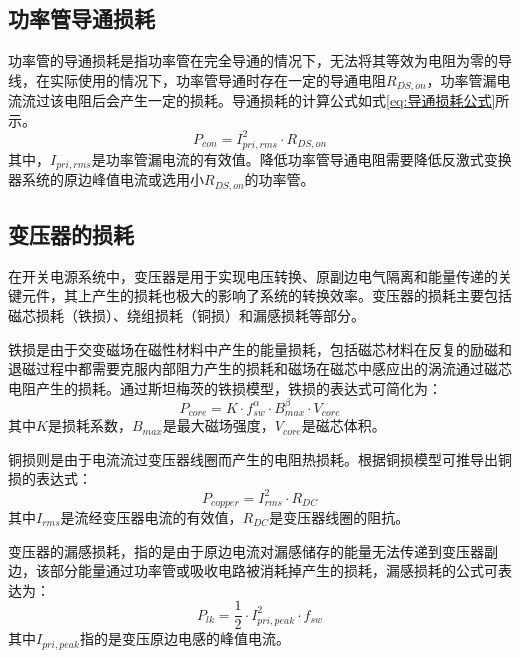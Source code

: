 \subsection{功率管导通损耗}

功率管的导通损耗是指功率管在完全导通的情况下，无法将其等效为电阻为零的导线，在实际使用的情况下，功率管导通时存在一定的导通电阻$R_{DS,on}$，功率管漏电流流过该电阻后会产生一定的损耗。导通损耗的计算公式如式\eqref{eq:导通损耗公式}所示。
\begin{equation}
    \label{eq:导通损耗公式}
    P_{con} = I_{pri,rms}^2 \cdot R_{DS,on}
\end{equation}
其中，$I_{pri,rms}$是功率管漏电流的有效值。降低功率管导通电阻需要降低反激式变换器系统的原边峰值电流或选用小$R_{DS,on}$的功率管。

\subsection{变压器的损耗}

在开关电源系统中，变压器是用于实现电压转换、原副边电气隔离和能量传递的关键元件，其上产生的损耗也极大的影响了系统的转换效率。变压器的损耗主要包括磁芯损耗（铁损）、绕组损耗（铜损）和漏感损耗等部分。

铁损是由于交变磁场在磁性材料中产生的能量损耗，包括磁芯材料在反复的励磁和退磁过程中都需要克服内部阻力产生的损耗和磁场在磁芯中感应出的涡流通过磁芯电阻产生的损耗。通过斯坦梅茨的铁损模型，铁损的表达式可简化为：
\begin{equation}
    \label{eq:铁损公式}
    P_{core} = K \cdot f_{sw}^\alpha  \cdot B_{max}^\beta \cdot V_{core} 
\end{equation}
其中$K$是损耗系数，$B_{max}$是最大磁场强度，$V_{core}$是磁芯体积。

铜损则是由于电流流过变压器线圈而产生的电阻热损耗。根据铜损模型可推导出铜损的表达式：
\begin{equation}
    \label{eq:铜损公式}
    P_{copper} = I_{rms}^2  \cdot R_{DC} 
\end{equation}
其中$I_{rms}$是流经变压器电流的有效值，$R_{DC}$是变压器线圈的阻抗。

变压器的漏感损耗，指的是由于原边电流对漏感储存的能量无法传递到变压器副边，该部分能量通过功率管或吸收电路被消耗掉产生的损耗，漏感损耗的公式可表达为：
\begin{equation}
    \label{eq:漏感损耗公式}
    P_{lk} = \frac{1}{2}\cdot I_{pri,peak}^2  \cdot f_{sw} 
\end{equation}
其中$I_{pri,peak}$指的是变压原边电感的峰值电流。

